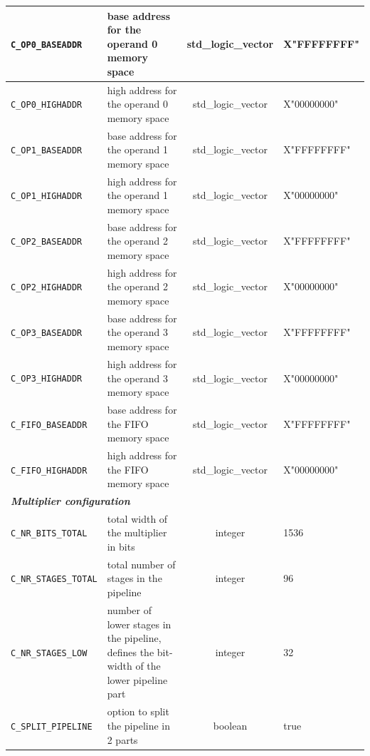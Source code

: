 \begin{center}
\begin{tabular}{|l|p{6.5cm}|c|l|}
		\hline
		\verb|C_OP0_BASEADDR| & base address for the operand 0 memory space & std\_logic\_vector & X"FFFFFFFF" \bigstrut\\
		\hline
		\verb|C_OP0_HIGHADDR| & high address for the operand 0 memory space & std\_logic\_vector & X"00000000" \bigstrut\\
		\hline
		\verb|C_OP1_BASEADDR| & base address for the operand 1 memory space & std\_logic\_vector & X"FFFFFFFF" \bigstrut\\
		\hline
		\verb|C_OP1_HIGHADDR| & high address for the operand 1 memory space & std\_logic\_vector & X"00000000" \bigstrut\\
		\hline
		\verb|C_OP2_BASEADDR| & base address for the operand 2 memory space & std\_logic\_vector & X"FFFFFFFF" \bigstrut\\
		\hline
		\verb|C_OP2_HIGHADDR| & high address for the operand 2 memory space & std\_logic\_vector & X"00000000" \bigstrut\\
		\hline
		\verb|C_OP3_BASEADDR| & base address for the operand 3 memory space & std\_logic\_vector & X"FFFFFFFF" \bigstrut\\
		\hline
		\verb|C_OP3_HIGHADDR| & high address for the operand 3 memory space & std\_logic\_vector & X"00000000" \bigstrut\\
		\hline
		\verb|C_FIFO_BASEADDR| & base address for the FIFO memory space & std\_logic\_vector & X"FFFFFFFF" \bigstrut\\
		\hline
		\verb|C_FIFO_HIGHADDR| & high address for the FIFO memory space & std\_logic\_vector & X"00000000" \bigstrut\\
		\hline
		\multicolumn{4}{|l|}{\textit{\textbf{Multiplier configuration}}} \\
		\hline
		\verb|C_NR_BITS_TOTAL| & total width of the multiplier in bits & integer & 1536\bigstrut\\
		\hline
		\verb|C_NR_STAGES_TOTAL| & total number of stages in the pipeline & integer & 96\bigstrut\\
		\hline
		\verb|C_NR_STAGES_LOW| & number of lower stages in the pipeline, defines the bit-width of the lower pipeline part & integer & 32 \bigstrut\\
		\hline
		\verb|C_SPLIT_PIPELINE| & option to split the pipeline in 2 parts & boolean & true \bigstrut\\
		\hline
	\end{tabular}%
\end{center}

